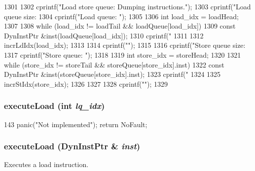 \begin{DoxyCode}
1301 {
1302     cprintf("Load store queue: Dumping instructions.\n");
1303     cprintf("Load queue size: %
1304     cprintf("Load queue: ");
1305 
1306     int load_idx = loadHead;
1307 
1308     while (load_idx != loadTail && loadQueue[load_idx]) {
1309         const DynInstPtr &inst(loadQueue[load_idx]);
1310         cprintf("%
1311 
1312         incrLdIdx(load_idx);
1313     }
1314     cprintf("\n");
1315 
1316     cprintf("Store queue size: %
1317     cprintf("Store queue: ");
1318 
1319     int store_idx = storeHead;
1320 
1321     while (store_idx != storeTail && storeQueue[store_idx].inst) {
1322         const DynInstPtr &inst(storeQueue[store_idx].inst);
1323         cprintf("%
1324 
1325         incrStIdx(store_idx);
1326     }
1327 
1328     cprintf("\n");
1329 }
\end{DoxyCode}
\hypertarget{classLSQUnit_a091a4d1788ce66e51ceb888bbd85ac08}{
\subsubsection[{executeLoad}]{ executeLoad (int {\em lq\_\-idx})}}
\label{classLSQUnit_a091a4d1788ce66e51ceb888bbd85ac08}



\begin{DoxyCode}
143 { panic("Not implemented"); return NoFault; }
\end{DoxyCode}
\hypertarget{classLSQUnit_a30c6332142c2ecca389ed6ee463c692b}{
\subsubsection[{executeLoad}]{ executeLoad ({\bf DynInstPtr} \& {\em inst})}}
\label{classLSQUnit_a30c6332142c2ecca389ed6ee463c692b}
Executes a load instruction. 


